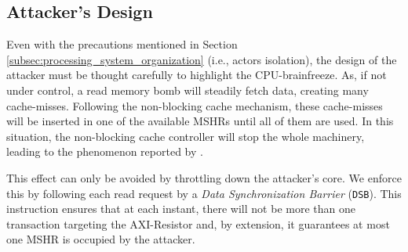 %
%

    \subsection{Attacker's Design}
        \label{subsec:attacker_design}

        Even with the precautions mentioned in Section \ref{subsec:processing_system_organization} (i.e., actors isolation), the design of the attacker must be thought carefully to highlight the CPU-brainfreeze. %
        As, if not under control, a read memory bomb will steadily fetch data, creating many cache-misses.
        Following the non-blocking cache mechanism, these cache-misses will be inserted in one of the available MSHRs until all of them are used.
        In this situation, the non-blocking cache controller will stop the whole machinery, leading to the phenomenon reported by \cite{Valsan2017AddressingIC}.

        This effect can only be avoided by throttling down the attacker's core.
        We enforce this by following each read request by a \emph{Data Synchronization Barrier} (\texttt{DSB}).
        This instruction ensures that at each instant, there will not be more than one transaction targeting the AXI-Resistor and, by extension, it guarantees at most one MSHR is occupied by the attacker.

